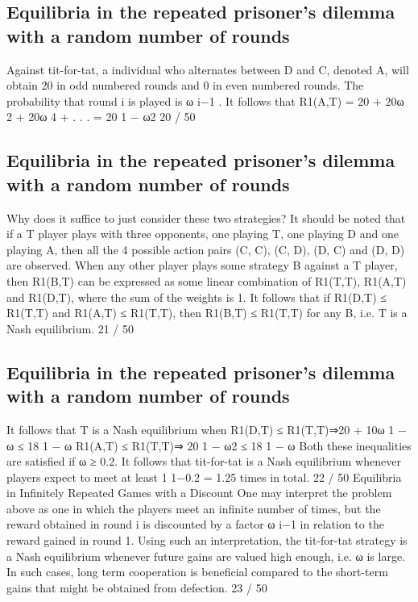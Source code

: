 \documentclass[]{report}
\begin{document}
\subsection{Equilibria in the repeated prisoner’s dilemma with a random number of rounds}

Against tit-for-tat, a individual who alternates between D and C,
denoted A, will obtain 20 in odd numbered rounds and 0 in even
numbered rounds. The probability that round i is played is ω
i−1
.
It follows that
R1(A,T) = 20 + 20ω
2 + 20ω
4 + . . . =
20
1 − ω2
20 / 50
\subsection{Equilibria in the repeated prisoner’s dilemma with a random number of rounds}

Why does it suffice to just consider these two strategies?
It should be noted that if a T player plays with three opponents,
one playing T, one playing D and one playing A, then all the 4
possible action pairs (C, C), (C, D), (D, C) and (D, D) are
observed.
When any other player plays some strategy B against a T player,
then R1(B,T) can be expressed as some linear combination of
R1(T,T), R1(A,T) and R1(D,T), where the sum of the weights
is 1.
It follows that if R1(D,T) ≤ R1(T,T) and R1(A,T) ≤ R1(T,T),
then R1(B,T) ≤ R1(T,T) for any B, i.e. T is a Nash equilibrium.
21 / 50
\subsection{Equilibria in the repeated prisoner’s dilemma with a random number of rounds}

It follows that T is a Nash equilibrium when
R1(D,T) ≤ R1(T,T)⇒20 + 10ω
1 − ω
≤
18
1 − ω
R1(A,T) ≤ R1(T,T)⇒
20
1 − ω2
≤
18
1 − ω
Both these inequalities are satisfied if ω ≥ 0.2. It follows that
tit-for-tat is a Nash equilibrium whenever players expect to meet at
least 1
1−0.2 = 1.25 times in total.
22 / 50
Equilibria in Infinitely Repeated Games with a Discount
One may interpret the problem above as one in which the players
meet an infinite number of times, but the reward obtained in round
i is discounted by a factor ω
i−1
in relation to the reward gained in
round 1.
Using such an interpretation, the tit-for-tat strategy is a Nash
equilibrium whenever future gains are valued high enough, i.e. ω is
large.
In such cases, long term cooperation is beneficial compared to the
short-term gains that might be obtained from defection.
23 / 50
\end{document}
